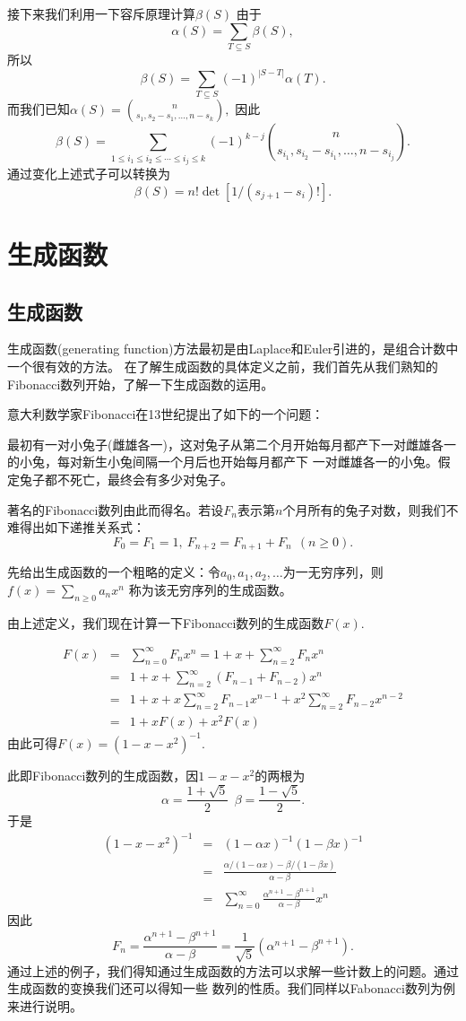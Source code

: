 \documentclass[a4paper,11pt,twoside]{book}
\begin{document}
 接下来我们利用一下容斥原理计算$\beta(S)$
由于
$$\alpha(S)=\sum_{T\subseteq S}\beta(S),$$ 所以
$$\beta(S)=\sum_{T\subseteq S}(-1)^{|S-T|}\alpha(T).$$
而我们已知$\alpha(S)={n\choose s_1,s_2-s_1,\ldots,n-s_k},$ 因此
$$\beta(S)=\sum_{1\leq i_1\leq i_2\leq\cdots \leq i_j\leq k}(-1)^{k-j}{n\choose s_{i_1},s_{i_2}-s_{i_1},\ldots,n-s_{i_j}}.$$
通过变化上述式子可以转换为
$$\beta(S)=n!\det[1/(s_{j+1}-s_i)!].$$




\chapter{生成函数}
\label{chap1} \minitoc

\section{生成函数}
生成函数(generating function)方法最初是由Laplace和Euler引进的，是组合计数中一个很有效的方法。
在了解生成函数的具体定义之前，我们首先从我们熟知的Fibonacci数列开始，了解一下生成函数的运用。

意大利数学家Fibonacci在13世纪提出了如下的一个问题：

最初有一对小兔子(雌雄各一)，这对兔子从第二个月开始每月都产下一对雌雄各一的小兔，每对新生小兔间隔一个月后也开始每月都产下
一对雌雄各一的小兔。假定兔子都不死亡，最终会有多少对兔子。

著名的Fibonacci数列由此而得名。若设$F_n$表示第$n$个月所有的兔子对数，则我们不难得出如下递推关系式：
$$F_0=F_1=1,\ F_{n+2}=F_{n+1}+F_n\ \ (n\geq 0).$$

先给出生成函数的一个粗略的定义：令$a_0,a_1,a_2,\ldots$为一无穷序列，则
$f(x)=\sum_{n\geq0}a_nx^n$
称为该无穷序列的生成函数。


由上述定义，我们现在计算一下Fibonacci数列的生成函数$F(x).$

\begin{eqnarray*}
F(x)&=&\sum_{n=0}^{\infty}F_nx^n=1+x+\sum_{n=2}^{\infty}F_nx^n\\
&=&1+x+\sum_{n=2}^{\infty}(F_{n-1}+F_{n-2})x^n\\
&=&1+x+x\sum_{n=2}^{\infty}F_{n-1}x^{n-1}+x^2\sum_{n=2}^{\infty}F_{n-2}x^{n-2}\\
&=&1+xF(x)+x^2F(x)
\end{eqnarray*}
由此可得$F(x)=(1-x-x^2)^{-1}.$

此即Fibonacci数列的生成函数，因$1-x-x^2$的两根为
$$\alpha=\frac{1+\sqrt{5}}{2}\ \ \beta=\frac{1-\sqrt{5}}{2}.$$
于是
\begin{eqnarray*}
(1-x-x^2)^{-1}&=&(1-\alpha x)^{-1}(1-\beta x)^{-1}\\
&=&\frac{\alpha/(1-\alpha x)-\beta/(1-\beta x)}{\alpha-\beta}\\
&=&\sum_{n=0}^{\infty}\frac{\alpha^{n+1}-\beta^{n+1}}{\alpha-\beta}x^n
\end{eqnarray*}
因此
\begin{equation}
F_n=\frac{\alpha^{n+1}-\beta^{n+1}}{\alpha-\beta}=\frac{1}{\sqrt{5}}(\alpha^{n+1}-\beta^{n+1}).
\end{equation}
通过上述的例子，我们得知通过生成函数的方法可以求解一些计数上的问题。通过生成函数的变换我们还可以得知一些
数列的性质。我们同样以Fabonacci数列为例来进行说明。
\end{document}

